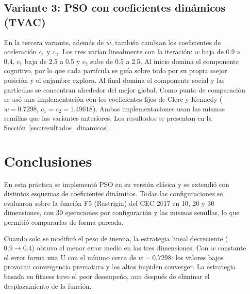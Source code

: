 \subsection{Variante 3: PSO con coeficientes dinámicos (TVAC)}
\label{sec:variante_tvac}

En la tercera variante, además de $w$, también cambian los coeficientes de aceleración $c_1$ y $c_2$. Los tres varían linealmente con la iteración: $w$ baja de 0.9 a 0.4, $c_1$ baja de 2.5 a 0.5 y $c_2$ sube de 0.5 a 2.5. Al inicio domina el componente cognitivo, por lo que cada partícula se guía sobre todo por su propia mejor posición y el enjambre explora. Al final domina el componente social y las partículas se concentran alrededor del mejor global. Como punto de comparación se usó una implementación con los coeficientes fijos de Clerc y Kennedy ($w = 0.7298$, $c_1 = c_2 = 1.49618$). Ambas implementaciones usan las mismas semillas que las variantes anteriores. Los resultados se presentan en la Sección~\ref{sec:resultados_dinamicos}.


\section{Conclusiones}

En esta práctica se implementó PSO en su versión clásica y se extendió con distintos esquemas de coeficientes dinámicos. Todas las configuraciones se evaluaron sobre la función F5 (Rastrigin) del CEC 2017 en 10, 20 y 30 dimensiones, con 30 ejecuciones por configuración y las mismas semillas, lo que permitió compararlas de forma pareada.

Cuando solo se modificó el peso de inercia, la estrategia lineal decreciente ($0.9 \rightarrow 0.4$) obtuvo el menor error medio en las tres dimensiones. Con $w$ constante el error forma una U con el mínimo cerca de $w = 0.7298$: los valores bajos provocan convergencia prematura y los altos impiden converger. La estrategia basada en fitness tuvo el peor desempeño, aun después de eliminar el desplazamiento de la función.

